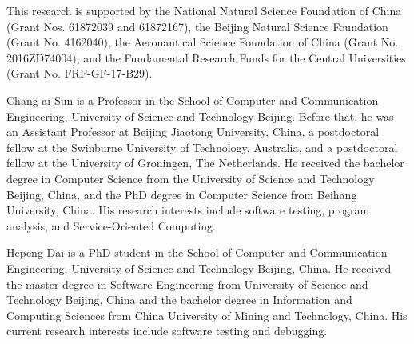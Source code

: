 \documentclass[10pt,journal,compsoc]{IEEEtran}
\begin{document}
This research is supported by
the National Natural Science Foundation of China (Grant Nos. 61872039 and 61872167),
the Beijing Natural Science Foundation (Grant No. 4162040),
the Aeronautical Science Foundation of China (Grant No. 2016ZD74004), and
the Fundamental Research Funds for the Central Universities (Grant No. FRF-GF-17-B29).
\ifCLASSOPTIONcaptionsoff
  \newpage
\fi


\vspace{-10ex}
\begin{IEEEbiography}{Chang-ai Sun} is a Professor in the School of Computer and Communication Engineering, University of Science and Technology Beijing.
Before that, he was an Assistant Professor at Beijing Jiaotong University, China, a postdoctoral fellow at the Swinburne University of Technology, Australia, and a postdoctoral fellow at the University of Groningen, The Netherlands. He received the bachelor degree in Computer Science from the University of Science and Technology Beijing, China, and the PhD degree in Computer Science from Beihang University, China.
His research interests include software testing, program analysis, and Service-Oriented Computing.
\end{IEEEbiography}
\vspace{-10ex}
\begin{IEEEbiography}{Hepeng Dai} is a PhD student in the School of Computer and Communication Engineering, University of Science and Technology Beijing, China. He received the master degree in Software Engineering from University of Science and Technology Beijing, China and the bachelor degree in Information and Computing Sciences from China University of Mining and Technology, China. His current research interests include software testing and debugging.
\end{IEEEbiography}
\end{document}
